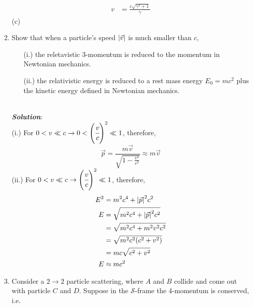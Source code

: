 \documentclass[10pt,a4paper]{article}
\theoremstyle{break}
\begin{document}
\begin{enumerate}
\begin{equation*}
\begin{split}
              v &= \frac{c\sqrt{\gamma^2 + 1}}{\gamma}
            \end{split}
          \end{equation*}
      (c)
    \item Show that when a particle's speed $\abs{\Vec{v}}$ is much smaller than $c$,
      \begin{enumerate}
        \item[(i.)] the reletavistic 3-momentum is reduced to the momentum in Newtonian mechanics.
        \item[(ii.)] the relativistic energy is reduced to a rest mass energy $E_0 = mc^2$ plus the kinetic energy defined in Newtonian mechanics.
      \end{enumerate}
      \newline\\
      \textbf{\textit{Solution}}:
      \newline\\
      (i.) For $0<v\ll c \to 0<\left(\cfrac{v}{c}\right)^2 \ll 1$, therefore,
          \[\Vec{p} = \frac{m\Vec{v}}{\sqrt{1- \frac{v^2}{c^2}}} \approx m\Vec{v}\]
      (ii.) For $0<v\ll c \to \left(\cfrac{v}{c}\right)^2 \ll 1$, therefore,
          \begin{equation*}
            \begin{split}
              E^2 &= m^2c^4 + \abs{\Vec{p}}^2c^2\\
              E &= \sqrt{m^2c^4 + \abs{\Vec{p}}^2c^2}\\
              &= \sqrt{m^2c^4 + m^2v^2c^2}\\
              &= \sqrt{m^2c^2(c^2+v^2)}\\
              &= mc\sqrt{c^2+v^2}\\
              E &\approx mc^2
            \end{split}
          \end{equation*}
    \item Consider a $2 \to 2$ particle scattering, where $A$ and $B$ collide and come out with particle $C$ and $D$. Suppose in the $\mathcal{S}$-frame the 4-momentum is conserved, i.e.

\end{enumerate}
\end{document}
